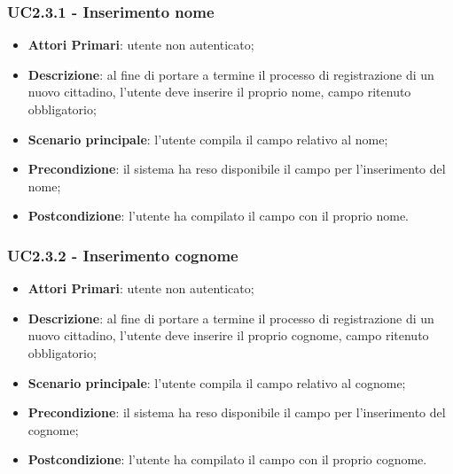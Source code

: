 \subsubsection{UC2.3.1 - Inserimento nome}
\begin{itemize}
	\item \textbf{Attori Primari}: utente non autenticato;
	\item \textbf{Descrizione}: al fine di portare a termine il processo di registrazione di un nuovo cittadino, l'utente deve inserire il proprio nome, campo ritenuto obbligatorio;
	\item \textbf{Scenario principale}: l'utente compila il campo relativo al nome;
	\item \textbf{Precondizione}: il sistema ha reso disponibile il campo per l'inserimento del nome;
	\item \textbf{Postcondizione}: l'utente ha compilato il campo con il proprio nome.
\end{itemize}
\subsubsection{UC2.3.2 - Inserimento cognome}
\begin{itemize}
	\item \textbf{Attori Primari}: utente non autenticato;
	\item \textbf{Descrizione}: al fine di portare a termine il processo di registrazione di un nuovo cittadino, l'utente deve inserire il proprio cognome, campo ritenuto obbligatorio;
	\item \textbf{Scenario principale}: l'utente compila il campo relativo al cognome;
	\item \textbf{Precondizione}: il sistema ha reso disponibile il campo per l'inserimento del cognome;
	\item \textbf{Postcondizione}: l'utente ha compilato il campo con il proprio cognome.
\end{itemize}

